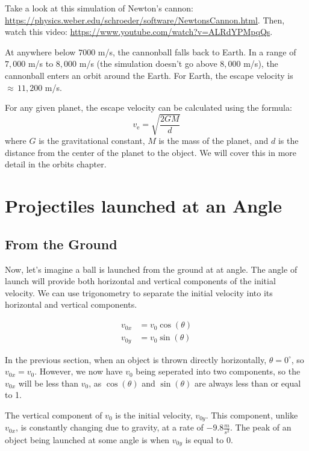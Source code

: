 Take a look at this simulation of Newton's cannon: \url{https://physics.weber.edu/schroeder/software/NewtonsCannon.html}. Then, watch this video: \url{https://www.youtube.com/watch?v=ALRdYPMpqQs}.

At anywhere below $7000$ m/s, the cannonball falls back to Earth. In a range of $7,000$ m/s to $8,000$ m/s (the simulation doesn't go above $8,000$ m/s), the cannonball enters an orbit around the Earth. For Earth, the escape velocity is $\approx \,11,200$ m/s.

For any given planet, the escape velocity can be calculated using the formula:
$${\displaystyle v_{\text{e}}={\sqrt {\frac {2GM}{d}}}}$$
where $G$ is the gravitational constant, $M$ is the mass of the planet, and $d$ is the distance from the center of the planet to the object. We will cover this in more detail in the orbits chapter.


\section{Projectiles launched at an Angle}
\subsection{From the Ground}

Now, let's imagine a ball is launched from the ground at at angle. The angle of launch will provide both horizontal and vertical components of the initial velocity. We can use trigonometry to separate the initial velocity into its horizontal and vertical components.

\begin{align*}
v_{0x} &= v_0 \cos(\theta) \\
v_{0y} &= v_0 \sin(\theta)
\end{align*}

In the previous section, when an object is thrown directly horizontally, $\theta = 0 ^\circ$, so $v_{0x} = v_0$. However, we now have $v_{0}$ being seperated into two components, so the $v_{0x}$ will be less than $v_0$, as $\cos(\theta)$ and $\sin(\theta)$ are always less than or equal to 1.

The vertical component of $v_0$ is the initial velocity, $v_{0y}$. This component, unlike $v_{0x}$, is constantly changing due to gravity, at a rate of $-9.8 \frac{m}{s^2}$. The peak of an object being launched at some angle is when $v_{0y}$ is equal to 0. 


